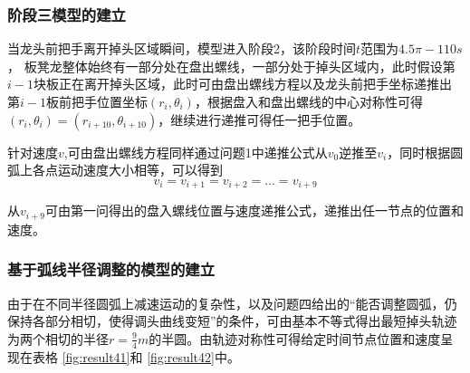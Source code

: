 \documentclass[withoutpreface,bwprint]{cumcmthesis}
\begin{document}
\subsubsection{阶段三模型的建立}
当龙头前把手离开掉头区域瞬间，模型进入阶段2，该阶段时间$t$范围为$4.5\pi-110s$， 板凳龙整体始终有一部分处在盘出螺线，一部分处于掉头区域内，此时假设第$i-1$块板正在离开掉头区域，此时可由盘出螺线方程以及龙头前把手坐标递推出第$i-1$板前把手位置坐标$(r_i,\theta_i)$，根据盘入和盘出螺线的中心对称性可得$(r_i,\theta_i) = (r_{i+10},\theta_{i+10})$，继续进行递推可得任一把手位置。

针对速度$v$,可由盘出螺线方程同样通过问题1中递推公式从$v_0$逆推至$v_{i}$，同时根据圆弧上各点运动速度大小相等，可以得到$$v_{i} = v_{i+1} = v_{i+2} = ... =v_{i+9}$$

从$v_{i+9}$可由第一问得出的盘入螺线位置与速度递推公式，递推出任一节点的位置和速度。
\subsubsection{基于弧线半径调整的模型的建立}
由于在不同半径圆弧上减速运动的复杂性，以及问题四给出的“能否调整圆弧，仍保持各部分相切，使得调头曲线变短”的条件，可由基本不等式得出最短掉头轨迹为两个相切的半径$r = \frac{9}{4}m$的半圆。由轨迹对称性可得给定时间节点位置和速度呈现在表格 \ref{fig:result41}和 \ref{fig:result42}中。
\end{document}
